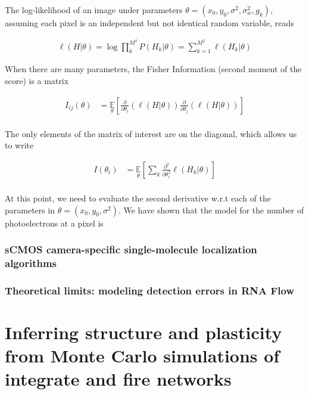 \documentclass{ucetd}
\begin{document}
\vspace{0.2in}
The log-likelihood of an image under parameters $\theta = (x_{0},y_{0},\sigma^{2},\sigma_{w}^{2},g_{k})$, assuming each pixel is an independent but not identical random variable, reads

\begin{align*}
\ell(H|\theta) = \log\prod_{k}^{M^{2}} P(H_{k}|\theta) = \sum_{k=1}^{M^{2}} \ell (H_{k}|\theta)
\end{align*}


When there are many parameters, the Fisher Information (second moment of the score) is a matrix

\begin{align*}
I_{ij}(\theta) &= \underset{\theta}{\mathbb{E}}\left[\frac{\partial}{\partial\theta_{i}} \left(\ell(H|\theta)\right)\frac{\partial}{\partial\theta_{j}} \left(\ell(H|\theta)\right)\right]\\
\end{align*}

The only elements of the matrix of interest are on the diagonal, which allows us to write

\begin{align*}
I(\theta_{i}) &= \underset{\theta}{\mathbb{E}}\left[\sum_{k}\frac{\partial^{2}}{\partial\theta_{i}^{2}}  \ell (H_{k}|\theta)\right]\\
\end{align*}

At this point, we need to evaluate the second derivative w.r.t each of the parameters in $\theta = (x_{0},y_{0},\sigma^{2})$. We have shown that the model for the number of photoelectrons at a pixel is




\subsection{sCMOS camera-specific single-molecule localization algorithms}

\subsection{Theoretical limits: modeling detection errors in RNA Flow}


\chapter{Inferring structure and plasticity from Monte Carlo simulations of integrate and fire networks}
\end{document}
